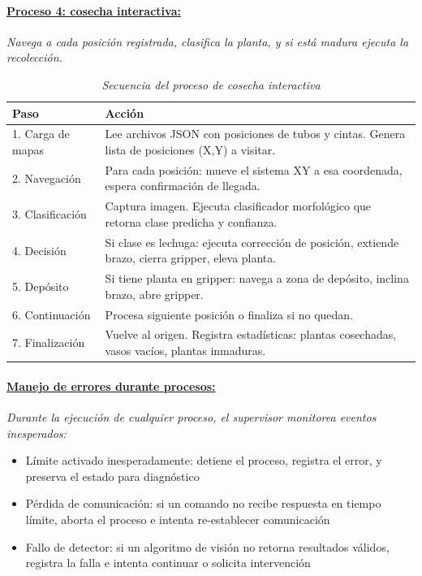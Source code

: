 \paragraph{\underline{Proceso 4: cosecha interactiva:}}

\textit{Navega a cada posición registrada, clasifica la planta, y si está madura ejecuta la recolección.}

\begin{table}[H]
\centering
\small
\begin{tabular}{|l|p{10cm}|}
\hline
Paso & Acción \\
\hline
1. Carga de mapas & Lee archivos JSON con posiciones de tubos y cintas. Genera lista de posiciones (X,Y) a visitar. \\
\hline
2. Navegación & Para cada posición: mueve el sistema XY a esa coordenada, espera confirmación de llegada. \\
\hline
3. Clasificación & Captura imagen. Ejecuta clasificador morfológico que retorna clase predicha y confianza. \\
\hline
4. Decisión & Si clase es lechuga: ejecuta corrección de posición, extiende brazo, cierra gripper, eleva planta. \\
\hline
5. Depósito & Si tiene planta en gripper: navega a zona de depósito, inclina brazo, abre gripper. \\
\hline
6. Continuación & Procesa siguiente posición o finaliza si no quedan. \\
\hline
7. Finalización & Vuelve al origen. Registra estadísticas: plantas cosechadas, vasos vacíos, plantas inmaduras. \\
\hline
\end{tabular}
\caption{\textit{Secuencia del proceso de cosecha interactiva}}
\label{tab:proceso_cosecha}
\end{table}

\paragraph{\underline{Manejo de errores durante procesos:}}

\textit{Durante la ejecución de cualquier proceso, el supervisor monitorea eventos inesperados:}

\begin{itemize}[label=$\bullet$]
    \item Límite activado inesperadamente: detiene el proceso, registra el error, y preserva el estado para diagnóstico
    \item Pérdida de comunicación: si un comando no recibe respuesta en tiempo límite, aborta el proceso e intenta re-establecer comunicación
    \item Fallo de detector: si un algoritmo de visión no retorna resultados válidos, registra la falla e intenta continuar o solicita intervención
\end{itemize}

